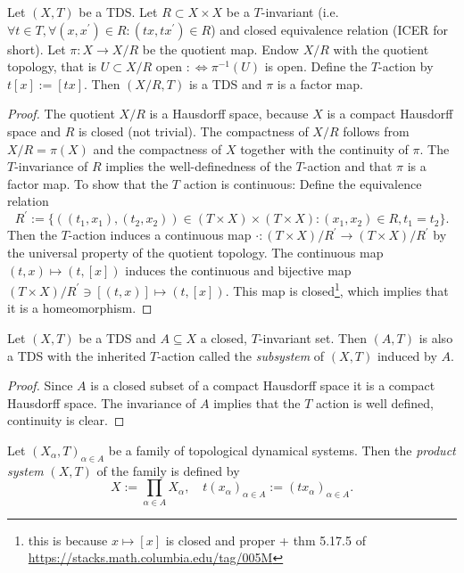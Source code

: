 \begin{proposition}
	Let $(X, T)$ be a TDS. Let $R \subset X \times X$ be a $T$-invariant (i.e. $\forall t \in T, \forall (x, x^\prime ) \in R : (tx, tx^\prime) \in R$) and closed equivalence relation (ICER for short). Let $\pi : X \to X/R$ be the quotient map. Endow $X/R$ with the quotient topology, that is $U \subset X/R$ open $: \Leftrightarrow \pi^{-1}(U)$ is open. Define the $T$-action by $t[x] := [tx]$. Then $(X/R, T)$ is a TDS and $\pi$ is a factor map.
\end{proposition}
\begin{proof}
	The quotient $X/R$ is a Hausdorff space, because $X$ is a compact Hausdorff space and $R$ is closed (not trivial). The compactness of $X/R$ follows from $X/R = \pi(X)$ and the compactness of $X$ together with the continuity of $\pi$. The $T$-invariance of $R$ implies the well-definedness of the $T$-action and that $\pi$ is a factor map. To show that the $T$ action is continuous: Define the equivalence relation
	\begin{equation*}
		R^\prime := \{ ((t_1,x_1), (t_2,x_2)) \in (T \times X) \times (T \times X): (x_1, x_2) \in R, t_1 = t_2\}.
	\end{equation*}
	Then the $T$-action induces a continuous map $\cdot : (T \times X)/R^\prime \to (T\times X)/R^\prime$ by the universal property of the quotient topology. The continuous map $(t, x) \mapsto (t, [x])$ induces the continuous and bijective map $(T\times X)/R^\prime \ni [(t, x)] \mapsto (t, [x])$. This map is closed\footnote{this is because $x \mapsto [x]$ is closed and proper + thm 5.17.5 of \url{https://stacks.math.columbia.edu/tag/005M}}, which implies that it is a homeomorphism.
\end{proof}

\begin{proposition}[Subsystem]
	Let $(X, T)$ be a TDS and $A \subseteq X$ a closed, $T$-invariant set.
	Then $(A, T)$ is also a TDS with the inherited $T$-action called the \emph{subsystem} of $(X, T)$ induced by $A$.
\end{proposition}
\begin{proof}
	Since $A$ is a closed subset of a compact Hausdorff space it is a compact Hausdorff space. The invariance of $A$ implies that the $T$ action is well defined, continuity is clear. 
\end{proof}

\begin{definition}
	Let $(X_\alpha, T)_{\alpha \in A}$ be a family of topological dynamical systems. Then the \emph{product system} $(X, T)$ of the family is defined by
	\begin{equation*}
		X := \prod_{\alpha \in A} X_\alpha, \quad t (x_\alpha)_{\alpha \in A} := (t x_\alpha)_{\alpha \in A}.
	\end{equation*}
\end{definition}

